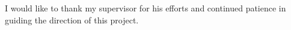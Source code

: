 I would like to thank my supervisor for his efforts and continued patience in guiding the direction of this project.